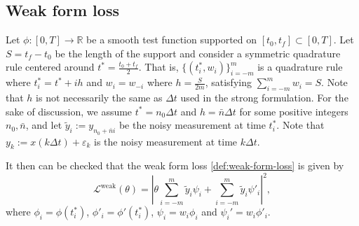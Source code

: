 \documentclass[final]{siamltex}
\newtheorem{assumption}{Assumption}[section]
\begin{document}
\subsection{Weak form loss}
Let $\phi:[0,T]\to \mathbb{R}$ be a smooth test function supported on $[t_0, t_f] \subset [0,T]$. Let $S = t_f-t_0$ be the length of the support and consider a symmetric quadrature rule centered around $t^* = \frac{t_0+t_f}{2}$.
That is, $\{(t^*_i, w_i)\}_{i=-m}^{m}$ is a quadrature rule where $t^*_i = t^* + i h$ and $w_i = w_{-i}$ where $h = \frac{S}{2m}$, satisfying $\sum_{i=-m}^m w_i = S$.
Note that $h$ is not necessarily the same as $\Delta t$ used in the strong formulation.
For the sake of discussion, we assume 
$t^* = n_0\Delta t$ and 
$h = \bar{n}\Delta t$ for some positive integers $n_0, \bar{n}$, and let $\tilde{y}_i := y_{n_0+\bar{n}i}$ be the noisy measurement at time $t_i^*$.
Note that $y_k:= x(k\Delta t) + \varepsilon_k$ is the noisy measurement at time $k\Delta t$.%


It then can be checked that the weak form loss \eqref{def:weak-form-loss} is given by
\begin{equation} \label{def:1D-weak-form-loss}
    \mathcal{L}^\text{weak}(\theta) = \left|\theta \sum_{i=-m}^m \tilde{y}_i\psi_i + \sum_{i=-m}^m \tilde{y}_i \psi'_i\right|^2,
\end{equation}
where $\phi_i = \phi(t_i^*)$, $\phi'_i = \phi'(t_i^*)$,
$\psi_{i} = w_i\phi_i$ and $\psi_i' = w_i\phi'_i$.
\end{document}
